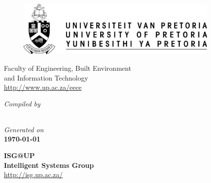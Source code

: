 
\thispagestyle{empty}
{
  \renewcommand{\baselinestretch}{1.2}
  \newcommand{\HRule}{\rule{\linewidth}{0.4mm}}
  \setlength{\parindent}{0mm}
  \setlength{\parskip}{0mm}
  \pagfamily{}
  \centering

  \begin{figure}[!ht]
    \centering\includegraphics[width=10cm]{up-logo.pdf}
  \end{figure}

  \medskip
  {\sc\Large\bchfamily Faculty of Engineering, Built Environment \\
    and Information Technology} \\
  \medskip
  \medskip
  {\sc\large\sffamily \eece}
  \url{http://www.up.ac.za/eece}


  {\Large\bfseries\MakeUppercase{\doctype}}


  {\slshape Compiled by} \\
  \medskip
  \medskip
  {\large\bfseries\docauthor} \\
  {\large\docstudentnumber}

  {\slshape Generated on}\\
  \medskip
  \medskip
  {\bfseries \today}


  {\Huge\lmssfamily\bfseries ISG@UP} \\
  {\bfseries \sc \Large Intelligent Systems Group} \\
  \url{http://isg.up.ac.za/} \\
}

